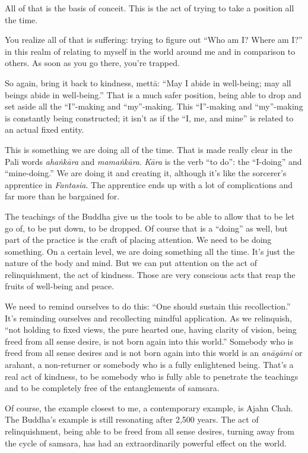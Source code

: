 All of that is the basis of conceit. This is the act of trying to take a
position all the time.

You realize all of that is suffering: trying to figure out “Who am I?
Where am I?” in this realm of relating to myself in the world around me
and in comparison to others. As soon as you go there, you’re trapped.

So again, bring it back to kindness, mettā: “May I abide in well-being;
may all beings abide in well-being.” That is a much safer position,
being able to drop and set aside all the “I”-making and “my”-making.
This “I”-making and “my”-making is constantly being constructed; it
isn’t as if the “I, me, and mine” is related to an actual fixed entity.

This is something we are doing all of the time. That is made really
clear in the Pali words \emph{ahaṅkāra} and \emph{mamaṅkāra}.
\emph{Kāra} is the verb “to do”: the “I-doing” and “mine-doing.” We are
doing it and creating it, although it’s like the sorcerer’s apprentice
in \emph{Fantasia}. The apprentice ends up with a lot of complications
and far more than he bargained for.

The teachings of the Buddha give us the tools to be able to allow that
to be let go of, to be put down, to be dropped. Of course that is a
“doing” as well, but part of the practice is the craft of placing
attention. We need to be doing something. On a certain level, we are
doing something all the time. It’s just the nature of the body and mind.
But we can put attention on the act of relinquishment, the act of
kindness. Those are very conscious acts that reap the fruits of
well-being and peace.

We need to remind ourselves to do this: “One should sustain this
recollection.” It’s reminding ourselves and recollecting mindful
application. As we relinquish, “not holding to fixed views, the pure
hearted one, having clarity of vision, being freed from all sense
desire, is not born again into this world.” Somebody who is freed from
all sense desires and is not born again into this world is an
\emph{anāgāmi} or arahant, a non-returner or somebody who is a fully
enlightened being. That’s a real act of kindness, to be somebody who is
fully able to penetrate the teachings and to be completely free of the
entanglements of samsara.

Of course, the example closest to me, a contemporary example, is Ajahn
Chah. The Buddha’s example is still resonating after 2,500 years. The
act of relinquishment, being able to be freed from all sense desires,
turning away from the cycle of samsara, has had an extraordinarily
powerful effect on the world.

